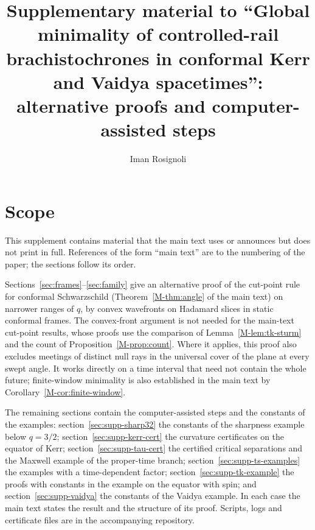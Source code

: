 \documentclass[aip,jmp,amsmath,amssymb,reprint]{revtex4-2}
\theoremstyle{plain}
\theoremstyle{definition}
\begin{document}
\title{Supplementary material to ``Global minimality of
controlled-rail brachistochrones in conformal Kerr and Vaidya spacetimes'': alternative proofs and
computer-assisted steps}
\author{Iman Rosignoli}
\maketitle

\section{Scope}
\label{sec:supp-scope}
This supplement contains material that the main text uses or announces but does not print in full. References
of the form ``main text'' are to the numbering of the paper; the sections follow its order.

Sections~\ref{sec:frames}--\ref{sec:family} give an alternative proof of the cut-point rule for conformal
Schwarzschild (Theorem~\ref{M-thm:angle} of the main text) on narrower ranges of $q$, by convex wavefronts on
Hadamard slices in static conformal frames. The convex-front argument is not needed for the main-text
cut-point results, whose proofs use the comparison of Lemma~\ref{M-lem:tk-sturm} and the count of
Proposition~\ref{M-prop:count}. Where it applies, this proof also excludes meetings of distinct null rays in
the universal cover of the plane at every swept angle. It works directly on a time interval that need not
contain the whole future; finite-window minimality is also established in the main text by
Corollary~\ref{M-cor:finite-window}.

The remaining sections contain the computer-assisted steps and the constants of the examples:
section~\ref{sec:supp-sharp32} the constants of the sharpness example below $q=3/2$;
section~\ref{sec:supp-kerr-cert} the curvature certificates on the equator of Kerr;
section~\ref{sec:supp-tau-cert} the certified critical separations and the Maxwell example of the proper-time
branch; section~\ref{sec:supp-ts-examples} the examples with a time-dependent factor;
section~\ref{sec:supp-tk-example} the proofs with constants in the example on the equator with spin; and
section~\ref{sec:supp-vaidya} the constants of the Vaidya example. In each case the main text states the
result and the structure of its proof. Scripts, logs and certificate files are in the accompanying repository.
\end{document}
